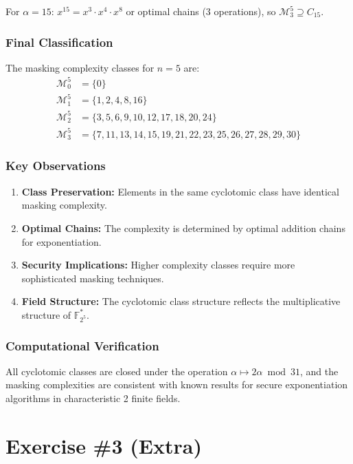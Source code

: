 \documentclass{article}
\begin{document}
For $\alpha = 15$: $x^{15} = x^3 \cdot x^4 \cdot x^8$ or optimal chains (3 operations), so $\mathcal{M}_3^5 \supseteq C_{15}$.

\subsubsection*{Final Classification}

The masking complexity classes for $n=5$ are:
\begin{align*}
\mathcal{M}_0^5 &= \{0\} \\
\mathcal{M}_1^5 &= \{1, 2, 4, 8, 16\} \\
\mathcal{M}_2^5 &= \{3, 5, 6, 9, 10, 12, 17, 18, 20, 24\} \\
\mathcal{M}_3^5 &= \{7, 11, 13, 14, 15, 19, 21, 22, 23, 25, 26, 27, 28, 29, 30\}
\end{align*}

\subsubsection*{Key Observations}

\begin{enumerate}
\item \textbf{Class Preservation:} Elements in the same cyclotomic class have identical masking complexity.
\item \textbf{Optimal Chains:} The complexity is determined by optimal addition chains for exponentiation.
\item \textbf{Security Implications:} Higher complexity classes require more sophisticated masking techniques.
\item \textbf{Field Structure:} The cyclotomic class structure reflects the multiplicative structure of $\mathbb{F}_{2^5}^*$.
\end{enumerate}

\subsubsection*{Computational Verification}

All cyclotomic classes are closed under the operation $\alpha \mapsto 2\alpha \bmod{31}$, and the masking complexities are consistent with known results for secure exponentiation algorithms in characteristic 2 finite fields.

\section*{Exercise \#3 (Extra)}
\end{document}
